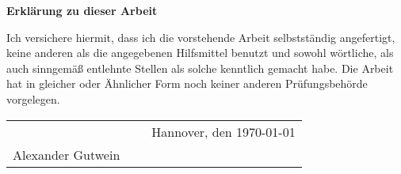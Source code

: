 \thispagestyle{empty}

\begin{large}
\null\vspace{6cm}
\textbf{Erklärung zu dieser Arbeit}
\end{large}
\null\vfill
\begin{flushleft}

Ich versichere hiermit, dass ich die vorstehende Arbeit selbstständig angefertigt, keine anderen als die angegebenen Hilfsmittel benutzt und sowohl wörtliche, als auch sinngemäß entlehnte Stellen als solche kenntlich gemacht habe. Die Arbeit hat in gleicher oder Ähnlicher Form noch keiner anderen Prüfungsbehörde vorgelegen.
\null\vfill
\begin{tabularx}{0.97\textwidth}{p{4cm} X p{4cm}}
\hrulefill & ~ & Hannover, den \today\\
	Alexander Gutwein & ~ & ~ \\
\end{tabularx}


\vspace{12pt}
\end{flushleft}
\null\vfill